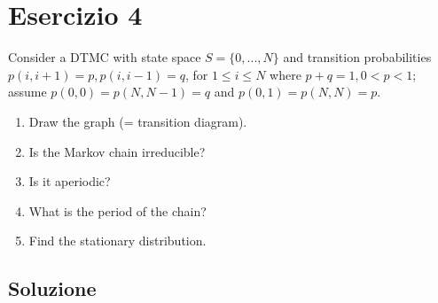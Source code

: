 \documentclass[
	12pt, %
]{fphw}
\begin{document}
\newpage
\section*{Esercizio 4}

\begin{problem}
	\smallskip
	Consider a DTMC with state space $S = \{0,...,N\}$ and transition probabilities $p(i, i+1) = p, p(i, i-1) = q$, for $1 \leq i \leq N$ where $p+q =1, 0 < p < 1$; assume $p(0, 0) = p(N,N-1)= q$ and $p(0, 1) = p(N,N)= p$.
	\medskip
	\begin{enumerate}
		\item Draw the graph (= transition diagram).
		\item Is the Markov chain irreducible?
		\item Is it aperiodic?
		\item What is the period of the chain?
		\item Find the stationary distribution.
	\end{enumerate}
	\smallskip
\end{problem}


\subsection*{Soluzione}
\end{document}
